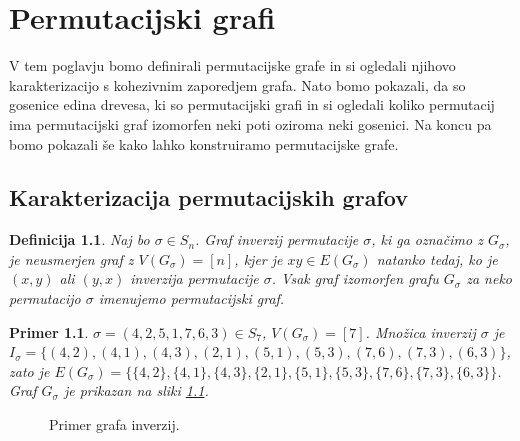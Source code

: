 \documentclass[a4paper, 12pt]{book}
\newtheorem{definicija}{Definicija}[chapter]
\newtheorem{primer}{Primer}[chapter]
\begin{document}
\chapter{ Permutacijski grafi }

V tem poglavju bomo definirali permutacijske grafe in si ogledali njihovo karakterizacijo s kohezivnim zaporedjem grafa. Nato bomo pokazali, da so gosenice edina drevesa, ki so permutacijski grafi in si ogledali koliko permutacij ima permutacijski graf izomorfen neki poti oziroma neki gosenici. Na koncu pa bomo pokazali še kako lahko konstruiramo permutacijske grafe.

\section{ Karakterizacija permutacijskih grafov }

\begin{definicija}
    Naj bo $\sigma \in S_n$. Graf inverzij permutacije $\sigma$, ki ga označimo z $G_{\sigma}$, je neusmerjen graf z $V(G_{\sigma}) = [n]$, kjer je $xy \in E(G_{\sigma})$ natanko tedaj, ko je $(x, y)$ ali $(y, x)$ inverzija permutacije $\sigma$. Vsak graf izomorfen grafu $G_{\sigma}$ za neko permutacijo $\sigma$ imenujemo permutacijski graf.
\end{definicija}

\begin{primer}
    $\sigma = (4, 2, 5, 1, 7, 6, 3) \in S_7$, $V(G_{\sigma}) =[7]$. Množica inverzij $\sigma$ je
    $I_{\sigma} = \{ (4, 2), (4, 1), (4, 3), (2, 1), (5, 1), (5, 3), (7, 6), (7, 3), (6, 3) \}$,
    zato je $E(G_{\sigma}) = \{ \{ 4, 2 \}, \{ 4, 1 \}, \{ 4, 3 \}, \{ 2, 1 \}, \{ 5, 1 \}, \{ 5, 3 \}, \{ 7, 6 \}, \{ 7, 3 \}, \{ 6, 3 \} \}$. Graf $G_{\sigma}$ je prikazan na sliki \ref{graf_inverzij}.
\end{primer}

\begin{figure}[h]
    \begin{center}        
    \end{center}
    \caption{Primer grafa inverzij.}
    \label{graf_inverzij}
\end{figure}
\end{document}
